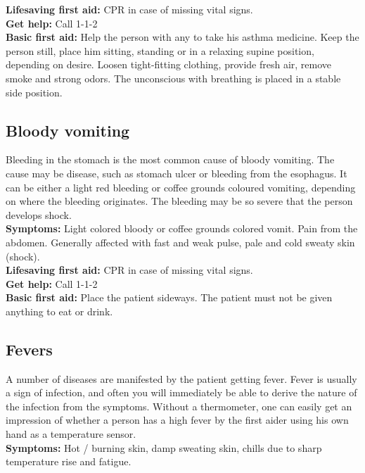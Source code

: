 \documentclass[../../../main.tex]{subfiles}
\begin{document}
\begin{multicols}{2}
\textbf{Lifesaving first aid:} CPR in case of missing vital signs.
\\

\textbf{Get help:} Call 1-1-2
\\

\textbf{Basic first aid:} Help the person with any to take his asthma medicine. Keep the person still, place him sitting, standing or in a relaxing supine position, depending on desire. Loosen tight-fitting clothing, provide fresh air, remove smoke and strong odors. The unconscious with breathing is placed in a stable side position.
\\
\subsection*{Bloody vomiting}Bleeding in the stomach is the most common cause of bloody vomiting. The cause may be disease, such as stomach ulcer or bleeding from the esophagus. It can be either a light red bleeding or coffee grounds coloured vomiting, depending on where the bleeding originates. The bleeding may be so severe that the person develops shock.
\\

\textbf{Symptoms:} Light colored bloody or coffee grounds colored vomit. Pain from the abdomen. Generally affected with fast and weak pulse, pale and cold sweaty skin (shock).
\\

\textbf{Lifesaving first aid:} CPR in case of missing vital signs.
\\

\textbf{Get help:} Call 1-1-2
\\

\textbf{Basic first aid:} Place the patient sideways. The patient must not be given anything to eat or drink.
\\

\subsection*{Fevers} A number of diseases are manifested by the patient getting fever. Fever is usually a sign of infection, and often you will immediately be able to derive the nature of the infection from the symptoms. Without a thermometer, one can easily get an impression of whether a person has a high fever by the first aider using his own hand as a temperature sensor.
\\

\textbf{Symptoms:} Hot / burning skin, damp sweating skin, chills due to sharp temperature rise and fatigue.
\\


\end{multicols}
\end{document}
